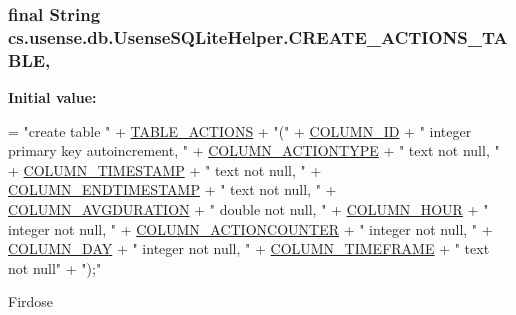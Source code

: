 \subsubsection[{C\+R\+E\+A\+T\+E\+\_\+\+A\+C\+T\+I\+O\+N\+S\+\_\+\+T\+A\+B\+L\+E}]{\setlength{\rightskip}{0pt plus 5cm}final String cs.\+usense.\+db.\+Usense\+S\+Q\+Lite\+Helper.\+C\+R\+E\+A\+T\+E\+\_\+\+A\+C\+T\+I\+O\+N\+S\+\_\+\+T\+A\+B\+L\+E\hspace{0.3cm}{\ttfamily [static]}, {\ttfamily [private]}}\label{classcs_1_1usense_1_1db_1_1_usense_s_q_lite_helper_a5163a40861c4ee9fb293134bd6e34d9e}
{\bfseries Initial value\+:}
\begin{DoxyCode}
= \textcolor{stringliteral}{"create table "}
            + \hyperlink{classcs_1_1usense_1_1db_1_1_usense_s_q_lite_helper_aca2589c9a7c772b25c1943554027e47a}{TABLE\_ACTIONS} + \textcolor{stringliteral}{"("}
            + \hyperlink{classcs_1_1usense_1_1db_1_1_usense_s_q_lite_helper_ac0c4ad3a273f5adda9bdfc60e679379d}{COLUMN\_ID} + \textcolor{stringliteral}{" integer primary key autoincrement, "}
            + \hyperlink{classcs_1_1usense_1_1db_1_1_usense_s_q_lite_helper_a4a0884baf404d0890424a74ec2e908e7}{COLUMN\_ACTIONTYPE} + \textcolor{stringliteral}{" text not null, "}
            + \hyperlink{classcs_1_1usense_1_1db_1_1_usense_s_q_lite_helper_a2887e35fa45755fe0b1d335cf79e4895}{COLUMN\_TIMESTAMP} + \textcolor{stringliteral}{" text not null, "}
            + \hyperlink{classcs_1_1usense_1_1db_1_1_usense_s_q_lite_helper_a5293e9bfb95dac32ba06d01a9554cb6d}{COLUMN\_ENDTIMESTAMP} + \textcolor{stringliteral}{" text not null, "}
            + \hyperlink{classcs_1_1usense_1_1db_1_1_usense_s_q_lite_helper_aa72cff6cb63d934c873f3b1b9a89093f}{COLUMN\_AVGDURATION} + \textcolor{stringliteral}{" double not null, "}
            + \hyperlink{classcs_1_1usense_1_1db_1_1_usense_s_q_lite_helper_aed53e7e347ec6da1cf3da4921f667895}{COLUMN\_HOUR} + \textcolor{stringliteral}{" integer not null, "}
            + \hyperlink{classcs_1_1usense_1_1db_1_1_usense_s_q_lite_helper_ac48d2caf493742fb1cc8146259593f42}{COLUMN\_ACTIONCOUNTER} + \textcolor{stringliteral}{" integer not null, "}
            + \hyperlink{classcs_1_1usense_1_1db_1_1_usense_s_q_lite_helper_a7bdb2b9648dfd58465fa92411a7696a7}{COLUMN\_DAY} + \textcolor{stringliteral}{" integer not null, "}
            + \hyperlink{classcs_1_1usense_1_1db_1_1_usense_s_q_lite_helper_aa94ebf764ce6581ae3866f82e4ac4bda}{COLUMN\_TIMEFRAME} + \textcolor{stringliteral}{" text not null"}
            + \textcolor{stringliteral}{");"}
\end{DoxyCode}
Firdose \hypertarget{classcs_1_1usense_1_1db_1_1_usense_s_q_lite_helper_a1883296a9536bdd979761d56e46fbeec}{}

